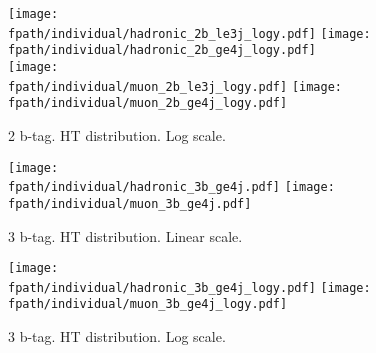 \documentclass[11pt,a4paper]{article}
\def\fpath{/home/hep/elaird1/public_html/119_2012_categories/v7/}
\begin{document}
\begin{figure}
\begin{center}
\texttt{[image: \\fpath/individual/hadronic\_2b\_le3j\_logy.pdf]}
\texttt{[image: \\fpath/individual/hadronic\_2b\_ge4j\_logy.pdf]}\\
\texttt{[image: \\fpath/individual/muon\_2b\_le3j\_logy.pdf]}
\texttt{[image: \\fpath/individual/muon\_2b\_ge4j\_logy.pdf]}\\
\caption{2 b-tag. HT distribution. Log scale.}
\end{center}
\end{figure}

\clearpage

\begin{figure}
\begin{center}
\texttt{[image: \\fpath/individual/hadronic\_3b\_ge4j.pdf]}
\texttt{[image: \\fpath/individual/muon\_3b\_ge4j.pdf]}
\caption{3 b-tag. HT distribution. Linear scale.}
\end{center}
\end{figure}


\begin{figure}
\begin{center}
\texttt{[image: \\fpath/individual/hadronic\_3b\_ge4j\_logy.pdf]}
\texttt{[image: \\fpath/individual/muon\_3b\_ge4j\_logy.pdf]}
\caption{3 b-tag. HT distribution. Log scale.}
\end{center}
\end{figure}
\end{document}
